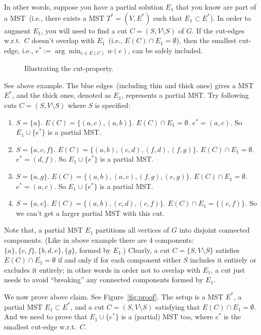 In other words, suppose you have a partial solution $E_1$ that you know
are part of a MST~(i.e., there exists a MST $T^* = (V, E^*)$ such that $E_1\subset E^*$). 
In order to augment $E_1$, you will need to find a cut $C = (S, V\setminus S)$ of $G$.
If the cut-edges w.r.t.\ $C$ doesn't overlap with $E_1$~(i.e., $E(C)\cap E_1 = \emptyset$),
then the smallest cut-edge, i.e., $e^* := \arg\min_{e\in E(C)} w(e)$,
can be safely included.

\begin{figure}[h]
\centering{}
\caption{Illustrating the cut-property.}
\label{fig:spanning}
\end{figure}

See above example. The blue edges~(including thin and thick ones)
gives a MST $E^*$, and the thick ones, denoted as $E_1$, represents a partial MST.
Try following cuts $C = (S, V\setminus S)$ where $S$ is specified:
\vspace*{-\topsep}
\begin{enumerate}
\item $S = \{a\}$. $E(C) = \{(a,c), (a,b)\}$. $E(C) \cap E_1 = \emptyset$. $e^* = (a,c)$.
So $E_1\cup\{e^*\}$ is a partial MST.
\item $S = \{a,c,f\}$. $E(C) = \{(a,b), (c,d), (f,d), (f,g)\}$. $E(C) \cap E_1 = \emptyset$. $e^* = (d,f)$.
So $E_1\cup\{e^*\}$ is a partial MST.
\item $S = \{a,g\}$. $E(C) = \{(a,b), (a,c), (f,g), (e,g)\}$. $E(C) \cap E_1 = \emptyset$. $e^* = (a,c)$.
So $E_1\cup\{e^*\}$ is a partial MST.
\item $S = \{a,c\}$. $E(C) = \{(a,b), (c,d), (c,f)\}$. $E(C) \cap E_1 = \{(c,f)\}$. So we can't get a larger partial MST with this cut.
\end{enumerate}

Note that, a partial MST $E_1$ partitions all vertices of $G$ into disjoint connected components.
(Like in above example there are 4 components: $\{a\}, \{c,f\}, \{b,d,e\}, \{g\}$, formed by $E_1$.)
Clearly, a cut $C=\{S,V\setminus S\}$ satisfies $E(C) \cap E_1 = \emptyset$ if and only if for each component
either $S$ includes it entirely or excludes it entirely;
in other words in order not to overlap with $E_1$, a cut just needs to avoid ``breaking''
any connected components formed by $E_1$.

We now prove above claim.  See Figure~\ref{fig:proof}.
The setup is a MST $E^*$, a partial MST $E_1\subset E^*$,
and a cut $C = (S,V\setminus S)$ satisfying that $E(C)\cap E_1 = \emptyset$.
And we need to prove that $E_1\cup \{e^*\}$ is a (partial) MST too,
where $e^*$ is the smallest cut-edge w.r.t.\ $C$.

